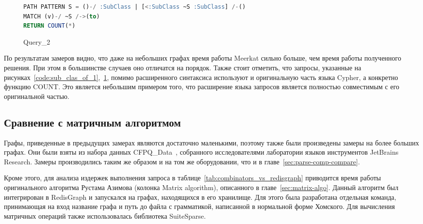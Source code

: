 \documentclass[14pt]{matmex-diploma-custom}
\newcommand{\gsv}[1]{\textcolor{red}{#1$^{\text{gsv}}$}}
\begin{document}
\begin{figure}[h!]
\begin{adjustbox}{max width=\textwidth}
\begin{lstlisting}[language=sql]
PATH PATTERN S = ()-/ :SubClass | [<:SubClass ~S :SubClass] /-()
MATCH (v)-/ ~S /->(to)
RETURN COUNT(*)
\end{lstlisting}
\end{adjustbox}
\caption{Query\_2}
\label{code:sub_clas_of_2}
\end{figure}

По результатам замеров видно, что даже на небольших графах время работы Meerkat сильно больше, чем время работы полученного решения. При этом в большинстве случаев оно отличатся на порядок. Также стоит отметить, что запросы, указанные на рисунках~\ref{code:sub_clas_of_1},~\ref{code:sub_clas_of_2}, помимо расширенного синтаксиса используют и оригинальную часть языка Cyp\-her, а конкретно функцию COUNT. Это является небольшим примером того, что расширение языка запросов является полностью совместимым с его оригинальной частью.


\subsection{Сравнение с матричным алгоритмом}
Графы, приведенные в предыдущих замерах являются достаточно маленькими, поэтому также были произведены замеры на более больших графах. Они были взяты из набора данных CFPQ\_Data~\cite{cfpq-data}, собранного исследователями лаборатории языков инструментов JetBrains Research. Замеры производились таким же образом и на том же оборудовании, что и в главе~\ref{sec:parse-comp-compare}.


Кроме этого, для анализа издержек выполнения запроса в таблице~\ref{tab:combinators_vs_redisgraph} приводится время работы оригинального алгоритма Рустама Азимова (колонка Matrix algorithm), описанного в главе~\ref{sec:matrix-algo}. Данный алгоритм был интегрирован в RedisGraph и запускался на графах, находящихся в его хранилище. Для этого была разработана отдельная команда, принимающая на вход название графа и путь до файла с грамматикой, написанной в нормальной форме Хомского. Для вычисления матричных операций также использовалась библиотека SuiteSparse.
\end{document}
